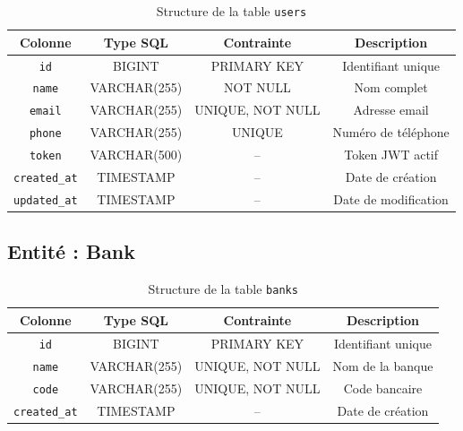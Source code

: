 \documentclass[12pt,a4paper]{article}
\newcommand{\tableheader}[1]{\textbf{#1}}
\begin{document}
\begin{table}[H]
    \centering
    \renewcommand{\arraystretch}{1.3}
    \begin{tabular}{|c|c|c|c|}
        \hline
        \tableheader{Colonne} & \tableheader{Type SQL} & \tableheader{Contrainte} & \tableheader{Description} \\
        \hline
        \texttt{id} & BIGINT & PRIMARY KEY & Identifiant unique \\
        \hline
        \texttt{name} & VARCHAR(255) & NOT NULL & Nom complet \\
        \hline
        \texttt{email} & VARCHAR(255) & UNIQUE, NOT NULL & Adresse email \\
        \hline
        \texttt{phone} & VARCHAR(255) & UNIQUE & Numéro de téléphone \\
        \hline
        \texttt{token} & VARCHAR(500) & -- & Token JWT actif \\
        \hline
        \texttt{created\_at} & TIMESTAMP & -- & Date de création \\
        \hline
        \texttt{updated\_at} & TIMESTAMP & -- & Date de modification \\
        \hline
    \end{tabular}
    \caption{Structure de la table \texttt{users}}
\end{table}

\subsection{Entité : Bank}

\begin{table}[H]
    \centering
    \renewcommand{\arraystretch}{1.3}
    \begin{tabular}{|c|c|c|c|}
        \hline
        \tableheader{Colonne} & \tableheader{Type SQL} & \tableheader{Contrainte} & \tableheader{Description} \\
        \hline
        \texttt{id} & BIGINT & PRIMARY KEY & Identifiant unique \\
        \hline
        \texttt{name} & VARCHAR(255) & UNIQUE, NOT NULL & Nom de la banque \\
        \hline
        \texttt{code} & VARCHAR(255) & UNIQUE, NOT NULL & Code bancaire \\
        \hline
        \texttt{created\_at} & TIMESTAMP & -- & Date de création \\
        \hline
    \end{tabular}
    \caption{Structure de la table \texttt{banks}}
\end{table}
\end{document}
